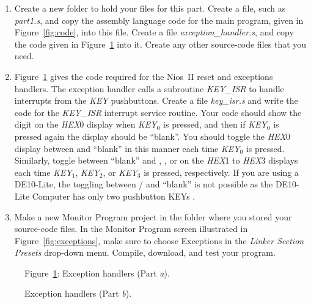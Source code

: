\documentclass[epsfig,10pt,fullpage]{article}
\begin{document}
\begin{enumerate}
\item Create a new folder to hold your files for this part. Create a
file, such as {\it part1.s}, and copy the assembly language code for the main program,
given in Figure~\ref{fig:code}, into this file. Create a file {\it exception\_handler.s},
and copy the code given in Figure~\ref{fig:handlers} into it.
Create any other source-code files that you need.

\item 
Figure~\ref{fig:handlers} gives the code required for the Nios~II reset and 
exceptions handlers. The exception handler calls a subroutine {\it KEY\_ISR} to handle interrupts from the {\it KEY} pushbuttons.
Create a file {\it key\_isr.s} and write the code for the {\it KEY\_ISR} interrupt service routine.
Your code should show the digit  on the {\it HEX}0 display when {\it KEY}$_0$ is
pressed, and then if {\it KEY}$_0$ is pressed again the display should be ``blank''. You should
toggle the {\it HEX}0 display between  and ``blank'' in this manner each time 
{\it KEY}$_0$ is pressed. Similarly, toggle between ``blank'' and , , or 
on the {\it HEX}1 to {\it HEX}3 displays each time {\it KEY}$_1$, {\it KEY}$_2$, or {\it KEY}$_3$ is pressed, respectively. 
If you are using a DE10-Lite, the toggling between / and ``blank'' is not possible as the DE10-Lite Computer has only
two pushbutton KEYs .

\item
Make a new Monitor Program project in the folder where you stored your source-code files.
In the Monitor Program screen illustrated in Figure~\ref{fig:exceptions}, make sure 
to choose {\sf Exceptions} in the {\it Linker Section Presets} drop-down menu.
Compile, download, and test your program. 
\end{enumerate}

\begin{figure}[H]
\begin{center}

Figure~\ref{fig:handlers}: Exception handlers (Part \textit{a}).
\end{center}
\end{figure}

\begin{figure}[H]
\begin{center}

\end{center}
\caption{Exception handlers (Part \textit{b}).}
\label{fig:handlers}
\end{figure}
~\\
\end{document}
